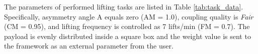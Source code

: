 The parameters of performed lifting tasks are listed in Table \ref{tab:task_data}. Specifically, asymmetry angle A equals zero (AM = 1.0), coupling quality is \emph{Fair} (CM = 0.95), and lifting frequency is controlled as 7 lifts/min (FM = 0.7). The payload is evenly distributed inside a square box and the weight value is sent to the framework as an external parameter from the user. 
\begin{table}[]
\centering
\caption{Experimental lifting task variables of RNLE.}
\end{table}
